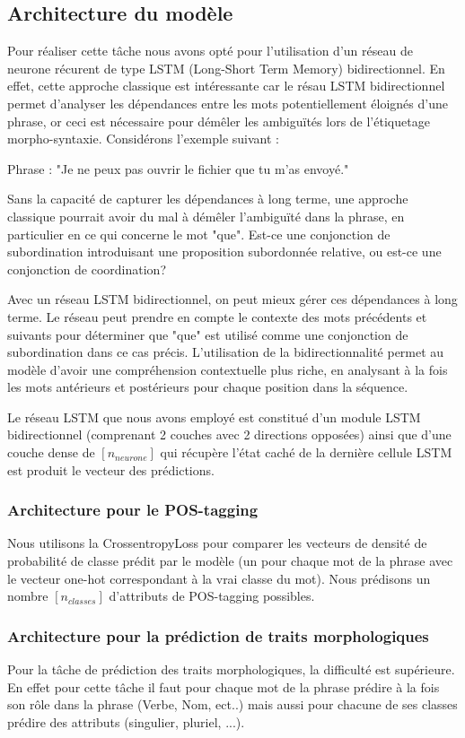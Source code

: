 \documentclass[a4paper]{article}
\begin{document}
\subsection{Architecture du modèle}
Pour réaliser cette tâche nous avons opté pour l'utilisation d'un réseau de neurone récurent de type LSTM 
(Long-Short Term Memory) bidirectionnel. En effet, cette approche classique est intéressante car le résau 
LSTM bidirectionnel permet d'analyser les dépendances entre les mots potentiellement éloignés d'une phrase, 
or ceci est nécessaire pour démêler les ambiguïtés lors de l'étiquetage morpho-syntaxie. Considérons l'exemple 
suivant :

Phrase : "Je ne peux pas ouvrir le fichier que tu m'as envoyé."

Sans la capacité de capturer les dépendances à long terme, une approche classique pourrait avoir du mal à 
démêler l'ambiguïté dans la phrase, en particulier en ce qui concerne le mot "que". Est-ce une conjonction 
de subordination introduisant une proposition subordonnée relative, ou est-ce une conjonction de coordination?

Avec un réseau LSTM bidirectionnel, on peut mieux gérer ces dépendances à long terme. Le réseau peut prendre 
en compte le contexte des mots précédents et suivants pour déterminer que "que" est utilisé comme une 
conjonction de subordination dans ce cas précis. L'utilisation de la bidirectionnalité permet au modèle 
d'avoir une compréhension contextuelle plus riche, en analysant à la fois les mots antérieurs et postérieurs 
pour chaque position dans la séquence. 

Le réseau LSTM que nous avons employé est constitué d'un module LSTM bidirectionnel (comprenant 2 couches avec 
2 directions opposées) ainsi que d'une couche dense de $[n_{neurone}]$ qui récupère l'état caché de la dernière 
cellule LSTM est produit le vecteur des prédictions. 

\subsubsection{Architecture pour le POS-tagging}
Nous utilisons la CrossentropyLoss pour comparer les vecteurs de densité de probabilité de classe prédit par 
le modèle (un pour chaque mot de la phrase avec le vecteur one-hot correspondant à la vrai classe du mot).
Nous prédisons un nombre $[n_{classes}]$ d'attributs de POS-tagging possibles. 

\subsubsection{Architecture pour la prédiction de traits morphologiques}
Pour la tâche de prédiction des traits morphologiques, la difficulté est supérieure. En effet pour cette tâche 
il faut pour chaque mot de la phrase prédire à la fois son rôle dans la phrase (Verbe, Nom, ect..) mais aussi 
pour chacune de ses classes prédire des attributs (singulier, pluriel, ...).
\end{document}
